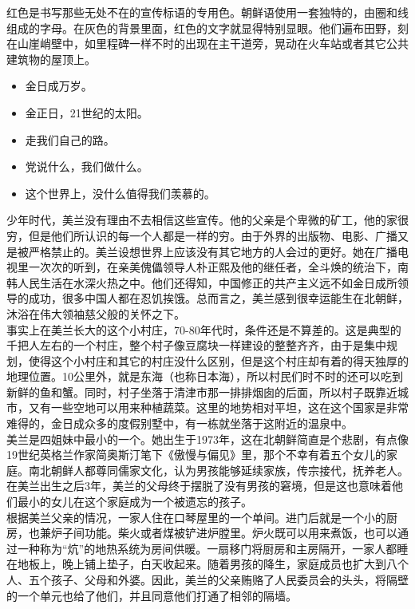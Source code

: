 红色是书写那些无处不在的宣传标语的专用色。朝鲜语使用一套独特的，由圈和线组成的字母。在灰色的背景里面，红色的文字就显得特别显眼。他们遍布田野，刻在山崖峭壁中，如里程碑一样不时的出现在主干道旁，晃动在火车站或者其它公共建筑物的屋顶上。\\

\begin{itemize}
	\item 金日成万岁。
	\item 金正日，21世纪的太阳。
	\item 走我们自己的路。
	\item 党说什么，我们做什么。
	\item 这个世界上，没什么值得我们羡慕的。
\end{itemize}

少年时代，美兰没有理由不去相信这些宣传。他的父亲是个卑微的矿工，他的家很穷，但是他们所认识的每一个人都是一样的穷。由于外界的出版物、电影、广播又是被严格禁止的。美兰设想世界上应该没有其它地方的人会过的更好。她在广播电视里一次次的听到，在亲美傀儡领导人朴正熙及他的继任者，全斗焕的统治下，南韩人民生活在水深火热之中。他们还得知，中国修正的共产主义远不如金日成所领导的成功，很多中国人都在忍饥挨饿。总而言之，美兰感到很幸运能生在北朝鲜，沐浴在伟大领袖慈父般的关怀之下。\\

事实上在美兰长大的这个小村庄，70-80年代时，条件还是不算差的。这是典型的千把人左右的一个村庄，整个村子像豆腐块一样建设的整整齐齐，由于是集中规划，使得这个小村庄和其它的村庄没什么区别，但是这个村庄却有着的得天独厚的地理位置。10公里外，就是东海（也称日本海），所以村民们时不时的还可以吃到新鲜的鱼和蟹。同时，村子坐落于清津市那一排排烟囱的后面，所以村子既靠近城市，又有一些空地可以用来种植蔬菜。这里的地势相对平坦，这在这个国家是非常难得的，金日成众多的度假别墅中，有一栋就坐落于这附近的温泉中。\\

美兰是四姐妹中最小的一个。她出生于1973年，这在北朝鲜简直是个悲剧，有点像19世纪英格兰作家简奥斯汀笔下《傲慢与偏见》里，那个不幸有着五个女儿的家庭。南北朝鲜人都尊同儒家文化，认为男孩能够延续家族，传宗接代，抚养老人。在美兰出生之后3年，美兰的父母终于摆脱了没有男孩的窘境，但是这也意味着他们最小的女儿在这个家庭成为一个被遗忘的孩子。\\

根据美兰父亲的情况，一家人住在口琴屋里的一个单间。进门后就是一个小的厨房，也兼炉子间功能。柴火或者煤被铲进炉膛里。炉火既可以用来煮饭，也可以通过一种称为“炕”的地热系统为房间供暖。一扇移门将厨房和主房隔开，一家人都睡在地板上，晚上铺上垫子，白天收起来。随着男孩的降生，家庭成员也扩大到八个人、五个孩子、父母和外婆。因此，美兰的父亲贿赂了人民委员会的头头，将隔壁的一个单元也给了他们，并且同意他们打通了相邻的隔墙。\\

